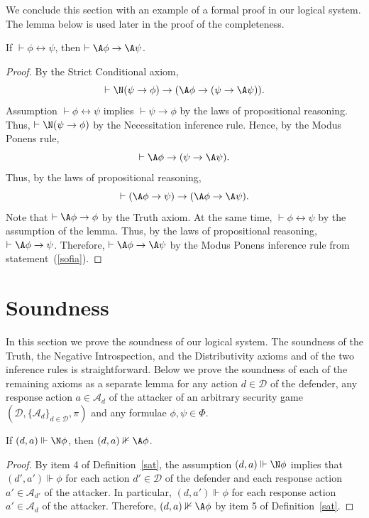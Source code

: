 \documentclass[letterpaper]{article}
\begin{document}
We conclude this section with an example of a formal proof in our logical system. The lemma below is used later in the proof of the completeness.

\begin{lemma}\label{biconditional lemma}
If $\vdash\phi\leftrightarrow\psi$, then $\vdash\A\phi\to\A\psi$.
\end{lemma}
\begin{proof}
By the Strict Conditional axiom,
$$
\vdash \N(\psi\to\phi)\to(\A\phi\to(\psi\to \A\psi)).
$$
Assumption  $\vdash \phi\leftrightarrow \psi$ implies $\vdash \psi\to \phi$ by the laws of propositional reasoning. Thus, $\vdash \N(\psi\to \phi)$ by the Necessitation inference rule. Hence, by the Modus Ponens rule,
$$
\vdash \A\phi\to(\psi\to \A\psi).
$$
Thus, by the laws of propositional reasoning,
\begin{equation}\label{sofia}
\vdash (\A\phi\to\psi)\to (\A\phi\to \A\psi).
\end{equation}
Note that $\vdash \A\phi\to\phi$ by the Truth axiom. At the same time, $\vdash \phi\leftrightarrow \psi$ by the assumption of the lemma. Thus, by the laws of propositional reasoning, $\vdash \A\phi\to\psi$. Therefore,
$
\vdash \A\phi\to \A\psi
$
by the Modus Ponens inference rule from statement~(\ref{sofia}).
\end{proof}

\section{Soundness}

In this section we prove the soundness of our logical system. The soundness of the Truth, the Negative Introspection, and the Distributivity axioms and of the two inference rules is straightforward. Below we prove the soundness of each of the remaining axioms as a separate lemma for any action $d\in\mathcal{D}$ of the defender, any response action $a\in\mathcal{A}_d$ of the attacker of an arbitrary security game $(\mathcal{D},\{\mathcal{A}_d\}_{d\in\mathcal{D}},\pi)$ and any formulae $\phi,\psi\in\Phi$. 

\begin{lemma}
If $(d,a)\Vdash \N\phi$, then $(d,a)\nVdash\A\phi$.
\end{lemma}
\begin{proof}
By item 4 of Definition~\ref{sat}, the assumption $(d,a)\Vdash \N\phi$ implies that $(d',a')\Vdash\phi$ for each action $d'\in\mathcal{D}$ of the defender and each response action $a'\in\mathcal{A}_{d'}$ of the attacker. In particular, $(d,a')\Vdash\phi$ for each response action $a'\in\mathcal{A}_{d}$ of the attacker. Therefore, $(d,a)\nVdash\A\phi$ by item 5 of Definition~\ref{sat}.
\end{proof}
\end{document}
